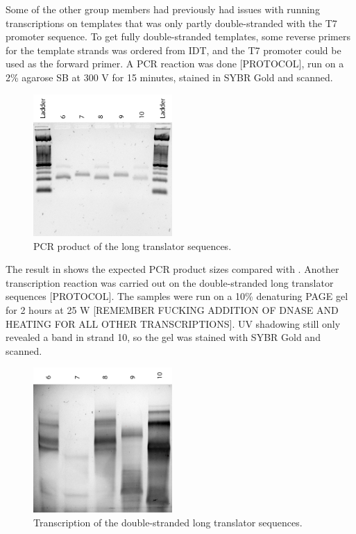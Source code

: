 Some of the other group members had previously had issues with running transcriptions on templates that was only partly double-stranded with the T7 promoter sequence. To get fully double-stranded templates, some reverse primers for the template strands was ordered from IDT, and the T7 promoter could be used as the forward primer. A PCR reaction was done [PROTOCOL], run on a 2\% agarose SB at 300 V for 15 minutes, stained in SYBR Gold and scanned.

\begin{figure}[H]
\centering
\includegraphics[width=150pt]{images/translator_pcr_long_1.png}
\caption{PCR product of the long translator sequences.}
\label{translator_pcr_long_1}
\end{figure}

The result in  shows the expected PCR product sizes compared with . Another transcription reaction was carried out on the double-stranded long translator sequences [PROTOCOL]. The samples were run on a 10\% denaturing PAGE gel for 2 hours at 25 W [REMEMBER FUCKING ADDITION OF DNASE AND HEATING FOR ALL OTHER TRANSCRIPTIONS]. UV shadowing still only revealed a band in strand 10, so the gel was stained with SYBR Gold and scanned.

\begin{figure}[H]
\centering
\includegraphics[width=150pt]{images/translator_transcription_long_ds_1.png}
\caption{Transcription of the double-stranded long translator sequences.}
\label{translator_transcription_long_ds_1}
\end{figure}


